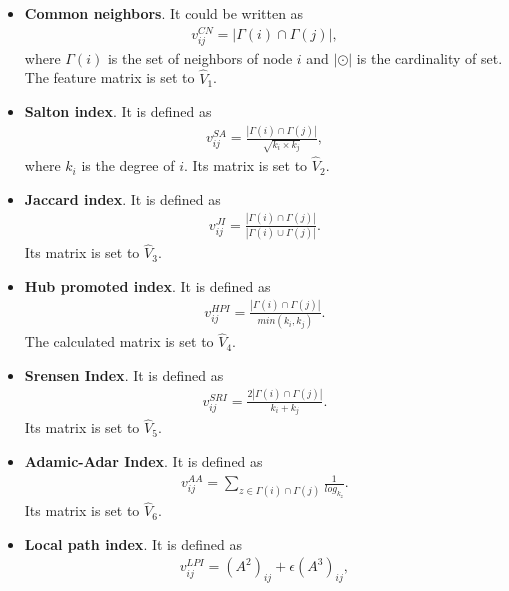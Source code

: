 \documentclass[journal]{IEEEtran}
\begin{document}
\begin{itemize}

    \item \textbf{Common neighbors}. It could be written as
        \begin{align}
            v_{ij}^{CN} = |\Gamma(i) \cap \Gamma(j)|,
        \label{eq1}
        \end{align}
        where $\Gamma(i)$ is the set of neighbors of node $i$ and $|\odot|$ is the cardinality of set. The feature matrix is set to $\hat{V}_1$.
    \item \textbf{Salton index}. It is defined as
        \begin{align}
            v_{ij}^{SA} = \frac{|\Gamma(i) \cap \Gamma(j)|}{\sqrt{k_i \times k_j}},
        \label{eq2}
        \end{align}
        where $k_i$ is the degree of $i$. Its matrix is set to $\hat{V}_2$.
    \item \textbf{Jaccard index}. It is defined as
        \begin{align}
            v_{ij}^{JI} = \frac{|\Gamma(i) \cap \Gamma(j)|}{|\Gamma(i) \cup \Gamma(j)|}.
        \label{eq3}
        \end{align}
        Its matrix is set to $\hat{V}_3$.
    \item \textbf{Hub promoted index}. It is defined as
        \begin{align}
            v_{ij}^{HPI} = \frac{|\Gamma(i) \cap \Gamma(j)|}{min(k_i,k_j)}.
        \label{eq4}
        \end{align}
        The calculated matrix is set to $\hat{V}_4$.
    \item \textbf{Srensen Index}. It is defined as
        \begin{align}
            v_{ij}^{SRI} = \frac{2|\Gamma(i) \cap \Gamma(j)|}{k_i+k_j}.
        \label{eq5}
        \end{align}
        Its matrix is set to $\hat{V}_5$.
    \item \textbf{Adamic-Adar Index}. It is defined as
        \begin{align}
            v_{ij}^{AA} = \sum_{z \in \Gamma(i) \cap \Gamma(j)}\frac{1}{log_{k_z}}.
        \label{eq6}
        \end{align}
        Its matrix is set to $\hat{V}_6$.
    \item \textbf{Local path index}. It is defined as
        \begin{align}
            v_{ij}^{LPI} = (A^2)_{ij}+\epsilon(A^3)_{ij},
        \label{eq7}

\end{align}
\end{itemize}
\end{document}
